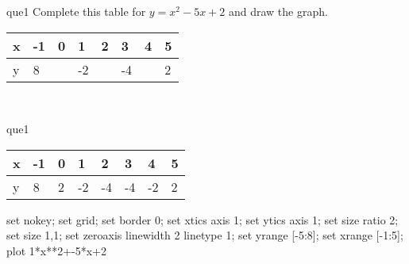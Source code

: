 \documentclass[13.5pt, varwidth=true]{beamer}
\begin{document}
\begin{frame}[shrink=19,fragile]
	\begin{beamercolorbox}[rounded=true, left, shadow=true,wd=14.8cm]{que1}
		 Complete this table for $y = x^{2} - 5x + 2$ and draw the graph. \\[0.3cm] \renewcommand{\arraystretch}{1.2}\begin{tabular}{|C|C|C|C|C|C|C|C|} \hline x & -1 & 0 & 1 & 2 & 3 & 4 & 5 \\ \hline y & 8 &  & -2 &  & -4 &  & 2\\ \hline \end{tabular}\\[0.3cm]
	\end{beamercolorbox}
\end{frame}
\begin{frame}[shrink=19,fragile]
	\begin{beamercolorbox}[rounded=true, left, shadow=true,wd=14.8cm]{que1}
		\renewcommand{\arraystretch}{1.2}\begin{tabular}{|C|C|C|C|C|C|C|C|} \hline x & -1 & 0 & 1 & 2 & 3 & 4 & 5 \\ \hline y & 8 & 2 & -2 & -4 & -4 & -2 & 2\\ \hline \end{tabular}\begin{gnuplot}[terminal=pdf] set nokey; set grid; set border 0; set xtics axis 1; set ytics axis 1; set size ratio 2; set size 1,1; set zeroaxis linewidth 2 linetype 1; set yrange [-5:8]; set xrange [-1:5]; plot 1*x**2+-5*x+2 \end{gnuplot}
	\end{beamercolorbox}
\end{frame}
\end{document}
